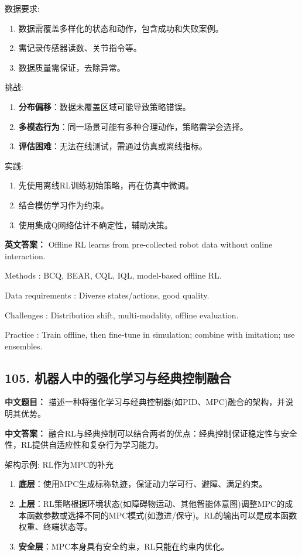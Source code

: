 \documentclass[10pt,a4paper]{ctexart}
\begin{document}
 数据要求:
\begin{enumerate}
    \item 数据需覆盖多样化的状态和动作，包含成功和失败案例。
    \item 需记录传感器读数、关节指令等。
    \item 数据质量需保证，去除异常。
\end{enumerate}

 挑战:
\begin{enumerate}
    \item \textbf{分布偏移}：数据未覆盖区域可能导致策略错误。
    \item \textbf{多模态行为}：同一场景可能有多种合理动作，策略需学会选择。
    \item \textbf{评估困难}：无法在线测试，需通过仿真或离线指标。
\end{enumerate}

 实践:
\begin{enumerate}
    \item 先使用离线RL训练初始策略，再在仿真中微调。
    \item 结合模仿学习作为约束。
    \item 使用集成Q网络估计不确定性，辅助决策。
\end{enumerate}

\textbf{英文答案：}  
Offline RL learns from pre-collected robot data without online interaction.

 Methods : BCQ, BEAR, CQL, IQL, model-based offline RL.

 Data requirements : Diverse states/actions, good quality.

 Challenges : Distribution shift, multi-modality, offline evaluation.

 Practice : Train offline, then fine-tune in simulation; combine with imitation; use ensembles.

\subsection*{105. 机器人中的强化学习与经典控制融合}
\textbf{中文题目：} 描述一种将强化学习与经典控制器(如PID、MPC)融合的架构，并说明其优势。

\textbf{中文答案：}  
融合RL与经典控制可以结合两者的优点：经典控制保证稳定性与安全性，RL提供自适应性和复杂行为学习能力。

 架构示例: RL作为MPC的补充 
\begin{enumerate}
    \item \textbf{底层}：使用MPC生成标称轨迹，保证动力学可行、避障、满足约束。
    \item \textbf{上层}：RL策略根据环境状态(如障碍物运动、其他智能体意图)调整MPC的成本函数参数或选择不同的MPC模式(如激进/保守)。RL的输出可以是成本函数权重、终端状态等。
    \item \textbf{安全层}：MPC本身具有安全约束，RL只能在约束内优化。
\end{enumerate}
\end{document}

